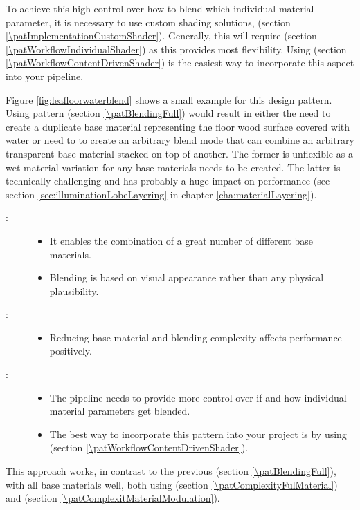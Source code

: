 \begin{description}
	To achieve this high control over how to blend which individual material parameter, it is necessary to use custom shading solutions, \emph{\patImplementationCustomShader} (section \ref{\patImplementationCustomShader}). Generally, this will require  \emph{\patWorkflowIndividualShader} (section \ref{\patWorkflowIndividualShader}) as this provides most flexibility.  Using \emph{\patWorkflowContentDrivenShader} (section \ref{\patWorkflowContentDrivenShader}) is the easiest way to incorporate this aspect into your pipeline.
	\item[\patExamples:]%
	Figure \ref{fig:leafloorwaterblend} shows a small example for this design pattern. Using pattern \emph{\patBlendingFull} (section \ref{\patBlendingFull}) would result in either the need to create a duplicate base material representing the floor wood surface covered with water or need to to create an arbitrary blend mode that can combine an arbitrary transparent base material stacked on top of another. The former is unflexible as a wet material variation for any base materials needs to be created. The latter is technically challenging and has probably a huge impact on performance (see section \ref{sec:illuminationLobeLayering} in chapter \ref{cha:materialLayering}).
	\item[\patConsequences:]\hfill 
		\begin{description}
		\item[\visual:]\hfill
			\begin{itemize}\mynobreakpar
				\item It enables the combination of a great number of different base materials.
				\item Blending is based on visual appearance rather than any physical plausibility. 
			\end{itemize}
			\item[\performance:]\hfill
			\begin{itemize}\mynobreakpar
				\item Reducing base material and blending complexity affects performance positively. 
			\end{itemize}
			\item[\pipeline:]\hfill
			\begin{itemize}\mynobreakpar
				\item The pipeline needs to provide more control over if and how individual material parameters get blended. 
				\item The best way to incorporate this pattern into your project is by using \emph{\patWorkflowContentDrivenShader} (section \ref{\patWorkflowContentDrivenShader}).
			\end{itemize}
		\end{description}
	\item[\patRelations:]%
	This approach works, in contrast to the previous \emph{\patBlendingFull} (section \ref{\patBlendingFull}), with all base materials well, both using \emph{\patComplexityFulMaterial} (section \ref{\patComplexityFulMaterial}) and \emph{\patComplexitMaterialModulation} (section \ref{\patComplexitMaterialModulation}). 
\end{description}

